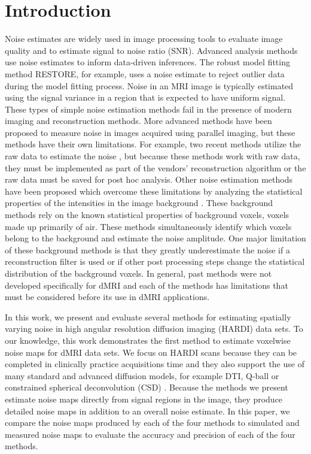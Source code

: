 \section{Introduction}

Noise estimates are widely used in image processing tools to evaluate
image quality and to estimate signal to noise ratio (SNR). Advanced
analysis methods use noise estimates to inform data-driven inferences.
The robust model fitting method RESTORE, for example, uses a noise
estimate to reject outlier data during the model fitting process. Noise
in an MRI image is typically estimated using the signal variance in a
region that is expected to have uniform signal. These types of simple
noise estimation methods fail in the presence of modern imaging and
reconstruction methods. More advanced methods have been proposed to
measure noise in images acquired using parallel imaging, but these
methods have their own limitations. For example, two recent methods
utilize the raw data to estimate the noise \cite{Robson_2008, Kellman_2005}, but because these methods work with raw data, they must be implemented as part of the
vendors' reconstruction algorithm or the raw data must be saved for post
hoc analysis. Other noise estimation methods have been proposed which
overcome these limitations by analyzing the statistical properties of
the intensities in the image background \cite{19346143, 27845653}. These
background methods rely on the known statistical properties of
background voxels, voxels made up primarily of air. These methods
simultaneously identify which voxels belong to the background and
estimate the noise amplitude. One major limitation of these background
methods is that they greatly underestimate the noise if a reconstruction
filter is used or if other post processing steps change the statistical
distribution of the background voxels\cite{Dietrich_2007}. In general,
past methods were not developed specifically for dMRI and each of the
methods has limitations that must be considered before its use in dMRI
applications.

In this work, we present and evaluate several methods for estimating
spatially varying noise in high angular resolution diffusion imaging
(HARDI) data sets. To our knowledge, this work demonstrates the first
method to estimate voxelwise noise maps for dMRI data sets. We focus on
HARDI scans because they can be completed in clinically practice
acquisitions time and they also support the use of many standard and
advanced diffusion models, for example DTI, Q-ball \cite{Tuch_2004}
 or constrained spherical deconvolution (CSD) \cite{Tournier_2007}. Because the
methods we present estimate noise maps directly from signal regions in
the image, they produce detailed noise maps in addition to an overall
noise estimate. In this paper, we compare the noise maps produced by each
of the four methods to simulated and measured noise maps to evaluate the
accuracy and precision of each of the four methods.